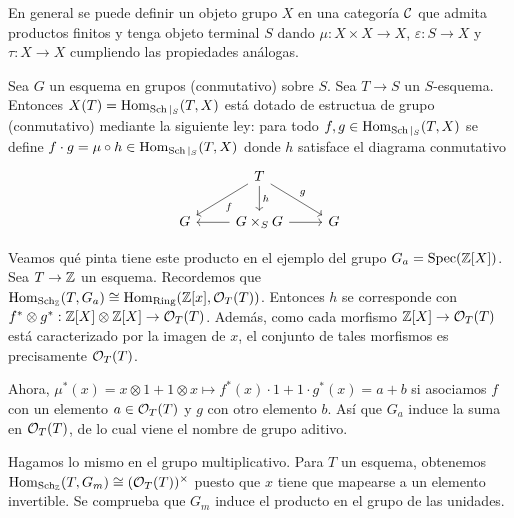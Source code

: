 \documentclass[GA.tex]{subfiles}
\begin{document}
En general se puede definir un objeto grupo $X$ en una categoría $\mathcal{C}$ que admita productos finitos y tenga objeto terminal $S$ dando  $\mu:X\times X\to X$, $\varepsilon:S\to X$ y $\tau:X\to X$ cumpliendo las propiedades análogas. 

\begin{prop}
Sea $G$ un esquema en grupos (conmutativo) sobre $S$. Sea $T\to S$ un $S$-esquema. Entonces $X(T)=\operatorname{Hom}_{\operatorname{Sch}|_S}(T,X)$ está dotado de estructua de grupo (conmutativo) mediante la siguiente ley: para todo $f,g\in\operatorname{Hom}_{\operatorname{Sch}|_S}(T,X)$ se define $f\cdot g=\mu\circ h\in\operatorname{Hom}_{\operatorname{Sch}|_S}(T,X)$ donde $h$ satisface el diagrama conmutativo
\[
\begin{tikzcd}
 & T\arrow[dl, "f"]\arrow[dr, "g"]\arrow[d, "h"] & \\
 G & G\times_S G\arrow[r] \arrow[l] & G
\end{tikzcd}
\]
\end{prop}
\begin{dem}
\end{dem}


\begin{ej}
Veamos qué pinta tiene este producto en el ejemplo del grupo $G_a=\operatorname{Spec}(\mathbb{Z}[X])$. Sea $T\to\mathbb{Z}$ un esquema. Recordemos que $\operatorname{Hom}_{\operatorname{Sch}_{\mathbb{Z}}}(T,G_a)\cong\operatorname{Hom}_{\operatorname{Ring}}(\mathbb{Z}[x],{\mathcal O}_T(T))$. Entonces $h$ se corresponde con $f^*\otimes g^*:\mathbb{Z}[X]\otimes\mathbb{Z}[X]\to{\mathcal O}_T(T)$. Además, como cada morfismo $\mathbb{Z}[X]\to{\mathcal O}_T(T)$ está caracterizado por la imagen de $x$, el conjunto de tales morfismos es precisamente ${\mathcal O}_T(T)$. 

Ahora, $\mu^*(x)=x\otimes 1+1\otimes x\mapsto f^*(x)\cdot 1+1\cdot g^*(x)=a+b$ si asociamos $f$ con un elemento $a\in{\mathcal O}_T(T)$ y $g$ con otro elemento $b$. Así que $G_a$ induce la suma en ${\mathcal O}_T(T)$, de lo cual viene el nombre de grupo aditivo. 
\end{ej}

\begin{ej}
Hagamos lo mismo en el grupo multiplicativo. Para $T$ un esquema, obtenemos $\operatorname{Hom}_{\operatorname{Sch}_{\mathbb{Z}}}(T,G_m)\cong({\mathcal O}_T(T))^\times$ puesto que $x$ tiene que mapearse a un elemento invertible. Se comprueba que $G_m$ induce el producto en el grupo de las unidades. 
\end{ej}
\end{document}
